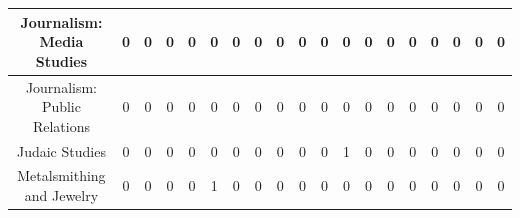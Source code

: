 \documentclass[10]{article}
\begin{document}
\begin{landscape}
\begin{longtable}[c]{|ccccccccccccccccccc|}
	\multicolumn{1}{|c|}{Journalism: Media Studies}                  & \multicolumn{1}{c|}{0}          & \multicolumn{1}{c|}{0}          & \multicolumn{1}{c|}{0}          & \multicolumn{1}{c|}{0}          & \multicolumn{1}{c|}{0}          & \multicolumn{1}{c|}{0}          & \multicolumn{1}{c|}{0}          & \multicolumn{1}{c|}{0}          & \multicolumn{1}{c|}{0}          & \multicolumn{1}{c|}{0}          & \multicolumn{1}{c|}{0}          & \multicolumn{1}{c|}{0}          & \multicolumn{1}{c|}{0}          & \multicolumn{1}{c|}{0}          & \multicolumn{1}{c|}{0}          & \multicolumn{1}{c|}{0}          & \multicolumn{1}{c|}{0}          & 0          \\ \hline
	\multicolumn{1}{|c|}{Journalism: Public Relations}               & \multicolumn{1}{c|}{0}          & \multicolumn{1}{c|}{0}          & \multicolumn{1}{c|}{0}          & \multicolumn{1}{c|}{0}          & \multicolumn{1}{c|}{0}          & \multicolumn{1}{c|}{0}          & \multicolumn{1}{c|}{0}          & \multicolumn{1}{c|}{0}          & \multicolumn{1}{c|}{0}          & \multicolumn{1}{c|}{0}          & \multicolumn{1}{c|}{0}          & \multicolumn{1}{c|}{0}          & \multicolumn{1}{c|}{0}          & \multicolumn{1}{c|}{0}          & \multicolumn{1}{c|}{0}          & \multicolumn{1}{c|}{0}          & \multicolumn{1}{c|}{0}          & 0          \\ \hline
	\multicolumn{1}{|c|}{Judaic Studies}                             & \multicolumn{1}{c|}{0}          & \multicolumn{1}{c|}{0}          & \multicolumn{1}{c|}{0}          & \multicolumn{1}{c|}{0}          & \multicolumn{1}{c|}{0}          & \multicolumn{1}{c|}{0}          & \multicolumn{1}{c|}{0}          & \multicolumn{1}{c|}{0}          & \multicolumn{1}{c|}{0}          & \multicolumn{1}{c|}{0}          & \multicolumn{1}{c|}{1}          & \multicolumn{1}{c|}{0}          & \multicolumn{1}{c|}{0}          & \multicolumn{1}{c|}{0}          & \multicolumn{1}{c|}{0}          & \multicolumn{1}{c|}{0}          & \multicolumn{1}{c|}{0}          & 0          \\ \hline
	\multicolumn{1}{|c|}{Metalsmithing and Jewelry}                  & \multicolumn{1}{c|}{0}          & \multicolumn{1}{c|}{0}          & \multicolumn{1}{c|}{0}          & \multicolumn{1}{c|}{0}          & \multicolumn{1}{c|}{1}          & \multicolumn{1}{c|}{0}          & \multicolumn{1}{c|}{0}          & \multicolumn{1}{c|}{0}          & \multicolumn{1}{c|}{0}          & \multicolumn{1}{c|}{0}          & \multicolumn{1}{c|}{0}          & \multicolumn{1}{c|}{0}          & \multicolumn{1}{c|}{0}          & \multicolumn{1}{c|}{0}          & \multicolumn{1}{c|}{0}          & \multicolumn{1}{c|}{0}          & \multicolumn{1}{c|}{0}          & 0          \\ \hline

\end{longtable}
\end{landscape}
\end{document}
